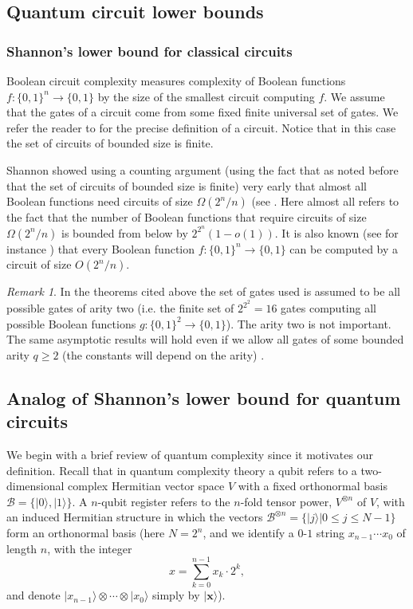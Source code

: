 \documentclass[10pt]{amsart}
\theoremstyle{definition}
\theoremstyle{remark}
\newtheorem{remark}{Remark}
\numberwithin{equation}{section}
\newcommand {\ra}   {{\rangle}}
\begin{document}
\subsection{Quantum circuit lower bounds}
\label{subsec:quantum}
\subsubsection{Shannon's lower bound for classical circuits}
Boolean circuit complexity measures complexity of Boolean functions $f: \{0,1\}^n \rightarrow \{0,1\}$ by the size of the smallest circuit computing  $f$.
We assume that the gates of a circuit come from some fixed finite universal set of gates.
We refer the reader to \cite[Page 7, Definition 3.1]{Wegener} for the precise definition of a circuit.
Notice that in this case the set of circuits of bounded size is finite. 

Shannon \cite{Shannon} showed using a counting argument (using the fact that as noted before that the set of circuits of bounded size is finite)  very early that almost all Boolean functions need circuits of size $\Omega({2^n}/{n})$ (see \cite[Page 90, Theorem 2.1]{Wegener}.
Here almost all refers to the fact that the number of Boolean functions that require circuits of size $\Omega({2^n}/{n})$ is bounded from below by $2^{2^n}(1 - o(1))$. It is also known (see for instance \cite[Page 92, Theorem 2.2]{Wegener}) that every Boolean
function $f: \{0,1\}^n \rightarrow \{0,1\}$ can be computed by a circuit of size $O({2^n}/{n})$.

\begin{remark}
\label{rem:arity-classical}
In the theorems cited above the set of gates used is assumed to be all possible gates 
of arity two (i.e. the finite set of $2^{2^2} = 16$ gates computing all possible Boolean functions 
$g:\{0,1\}^2 \rightarrow \{0,1\}$). The arity two is not important. The same asymptotic results will
hold even if we allow all gates of some bounded arity $q \geq 2$ 
(the constants will depend on the arity) .
\end{remark}


\subsection{Analog of Shannon's lower bound for quantum circuits}
We begin with a brief review of quantum complexity since it motivates our definition.
Recall that in quantum complexity theory a qubit refers to a two-dimensional complex Hermitian 
vector space $V$ with a fixed orthonormal basis $\mathcal{B} = \{|0\ra, |1\ra\}$. A $n$-qubit register refers to
the $n$-fold tensor power, $V^{\otimes n}$ of $V$, with an induced Hermitian structure in which the vectors
$\mathcal{B}^{\otimes n} = \{|j\ra | 0 \leq j \leq N-1\}$ form an orthonormal basis
(here $N = 2^n$, and we identify a $0$-$1$ string $x_{n-1}\cdots x_{0}$ of length $n$, with the integer
\[
x = \sum_{k=0}^{n-1} x_k \cdot 2^k,
\]
and denote $|x_{n-1}\ra\otimes \cdots \otimes |x_0\ra$ simply by $|\mathbf{x}\ra$).
\end{document}
